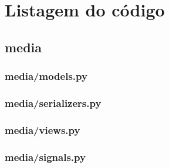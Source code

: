 \newcommand{\codeFolder}{../../tests/django-backbone_0}
                   
\chapter{Listagem do código}
\label{ApendiceA}

\section{media}

%

%

\subsection{media/models.py}


\subsection{media/serializers.py}

\subsection{media/views.py}


\subsection{media/signals.py}
%

%

